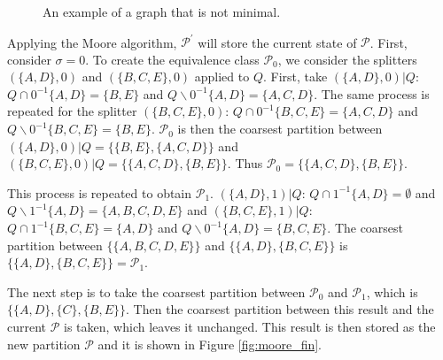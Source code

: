 {\begin{figure}
\centering
{}
\caption{An example of a graph that is not minimal.\label{fig:moore_ex}}
\end{figure}

Applying the Moore algorithm, $\mathcal{P}^{\prime}$ will store the current state of $\mathcal{P}$. First, consider $\sigma = 0$. To create the equivalence class $\mathcal{P}_0$, we consider the splitters $(\{A,D\},0)$ and $(\{B,C,E\},0)$ applied to $Q$. First, take $(\{A,D\},0)|Q$: $Q\cap 0^{-1}\{A,D\} = \{B,E\}$ and $Q\backslash 0^{-1}\{A,D\} = \{A, C, D\}$. The same process is repeated for the splitter $(\{B,C,E\},0)$: $Q\cap 0^{-1}\{B,C,E\} = \{A,C,D\}$ and $Q\backslash 0^{-1}\{B,C,E\} = \{B,E\}$. $\mathcal{P}_0$ is then the coarsest partition between $(\{A,D\},0)|Q = \{\{B,E\},\{A,C,D\}\}$ and $(\{B,C,E\},0)|Q = \{\{A,C,D\},\{B,E\}\}$. Thus $\mathcal{P}_0 = \{\{A,C,D\},\{B,E\}\}$.

This process is repeated to obtain $\mathcal{P}_1$. $(\{A,D\},1)|Q$: $Q\cap 1^{-1}\{A,D\} = \emptyset$ and $Q\backslash 1^{-1}\{A,D\} = \{A, B, C, D, E\}$ and $(\{B,C,E\},1)|Q$: $Q\cap 1^{-1}\{B,C,E\} = \{A,D\}$ and $Q\backslash 0^{-1}\{A,D\} = \{B, C, E\}$. The coarsest partition between $\{\{A,B,C,D,E\}\}$ and $\{\{A,D\},\{B,C,E\}\}$ is $\{\{A,D\},\{B,C,E\}\} = \mathcal{P}_1$.

The next step is to take the coarsest partition between $\mathcal{P}_0$ and $\mathcal{P}_1$, which is $\{\{A,D\},\{C\},\{B,E\}\}$. Then the coarsest partition between this result and the current $\mathcal{P}$ is taken, which leaves it unchanged. This result is then stored as the new partition $\mathcal{P}$ and it is shown in Figure \ref{fig:moore_fin}.


}
